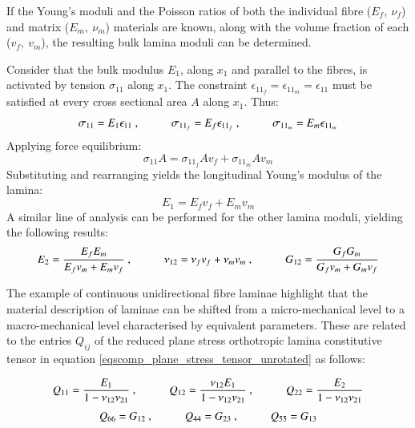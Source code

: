 If the Young's moduli and the Poisson ratios of both the individual fibre ($E_f,\ \nu_f$) and matrix ($E_m,\ \nu_m$) materials are known, along with the volume fraction of each ($v_f,\ v_m$), the resulting bulk lamina moduli can be determined. 

Consider that the bulk modulus $E_1$, along $x_1$ and parallel to the fibres, is activated by tension $\sigma_{11}$ along $x_1$. The constraint $\epsilon_{11_f} = \epsilon_{11_m} = \epsilon_{11}$ must be satisfied at every cross sectional area $A$ along $x_1$. Thus:
\begin{equation} 
\sigma_{11} = E_1\epsilon_{11}\ ,
\hspace{10mm}
\sigma_{11_f} = E_f\epsilon_{11_f}\ ,
\hspace{10mm}
\sigma_{11_m} = E_m\epsilon_{11_m}
\label{eqscomp5}
\end{equation}
Applying force equilibrium:
\begin{equation} 
\sigma_{11}A = \sigma_{11_f}A v_f + \sigma_{11_m}A v_m
\label{eqscomp6}
\end{equation}
Substituting and rearranging yields the longitudinal Young's modulus of the lamina:
\begin{equation} 
E_1 = E_f v_f + E_m v_m
\label{eqscomp7}
\end{equation}
A similar line of analysis can be performed for the other lamina moduli, yielding the following results:
\begin{equation} 
E_2 = \frac{E_f E_m}{E_f v_m + E_m v_f}\ ,
\hspace{10mm}
\nu_{12} = \nu_f v_f + \nu_m v_m\ ,
\hspace{10mm}
G_{12} = \frac{G_f G_m}{G_f v_m + G_m v_f}
\label{eqscomp8}
\end{equation}

The example of continuous unidirectional fibre laminae highlight that the material description of laminae can be shifted from a micro-mechanical level to a macro-mechanical level characterised by equivalent parameters. These are related to the entries $Q_{ij}$ of the reduced plane stress orthotropic lamina constitutive tensor in equation \ref{eqscomp_plane_stress_tensor_unrotated} as follows:

\begin{equation} 
Q_{11} = \frac{E_1}{1-\nu_{12} \nu_{21}}\ ,
\hspace{10mm}
Q_{12} = \frac{\nu_{12} E_1}{1-\nu_{12} \nu_{21}}\ ,
\hspace{10mm}
Q_{22} = \frac{E_2}{1-\nu_{12} \nu_{21}}
\label{eqscomp9}
\end{equation}
\begin{equation} 
Q_{66} = G_{12}\ ,
\hspace{10mm}
Q_{44} = G_{23}\ ,
\hspace{10mm}
Q_{55} = G_{13}
\label{eqscomp10}
\end{equation}


